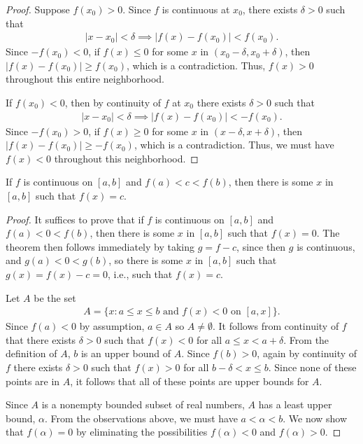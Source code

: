 \documentclass[12pt,letterpaper,reqno]{article}
\numberwithin{equation}{section}
\begin{document}
{\begin{proof}
	Suppose $f(x_0)>0$. Since $f$ is continuous at $x_0$, there exists $\delta>0$ such that 
	\begin{align*}
		|x-x_0|<\delta \implies |f(x)-f(x_0)|<f(x_0).
	\end{align*}
	Since $-f(x_0)<0$, if $f(x)\leq 0$ for some $x$ in $(x_0-\delta,x_0+\delta)$, then $|f(x)-f(x_0)|\geq f(x_0)$, which is a contradiction. Thus, $f(x)>0$ throughout this entire neighborhood.
	
	If $f(x_0)<0$, then by continuity of $f$ at $x_0$ there exists $\delta>0$ such that 
	\begin{align*}
		|x-x_0|<\delta \implies |f(x)-f(x_0)|<-f(x_0).
	\end{align*}
	Since $-f(x_0)>0$, if $f(x) \geq 0$ for some $x$ in $(x-\delta,x+\delta)$, then $|f(x)-f(x_0)|\geq -f(x_0)$, which is a contradiction. Thus, we must have $f(x)<0$ throughout this neighborhood.
\end{proof}

\begin{thm}
	If $f$ is continuous on $[a,b]$ and $f(a)<c<f(b)$, then there is some $x$ in $[a,b]$ such that $f(x)=c$.
\end{thm}

\begin{proof}
	It suffices to prove that if $f$ is continuous on $[a,b]$ and $f(a)<0<f(b)$, then there is some $x$ in $[a,b]$ such that $f(x)=0$. The theorem then follows immediately by taking $g=f-c$, since  then $g$ is continuous, and $g(a)<0<g(b)$, so there is some $x$ in $[a,b]$ such that $g(x)=f(x)-c=0$, i.e., such that $f(x)=c$.
	
	Let $A$ be the set
	\begin{align*}
		A=\{x:a \leq x \leq b \text{ and } f(x)<0 \text{ on } [a,x]\}.
	\end{align*}
	Since $f(a)<0$ by assumption, $a \in A$ so $A \neq \emptyset$. It follows from continuity of $f$ that there exists $\delta>0$ such that $f(x)<0$ for all $a \leq x <a+\delta$. From the definition of $A$, $b$ is an upper bound of $A$. Since $f(b)>0$, again by continuity of $f$ there exists $\delta>0$ such that $f(x)>0$ for all $b-\delta < x \leq b$. Since none of these points are in $A$, it follows that all of these points are upper bounds for $A$.
	
	Since $A$ is a nonempty bounded subset of real numbers, $A$ has a least upper bound, $\alpha$. From the observations above, we must have $a< \alpha<b$. We now show that $f(\alpha)=0$ by eliminating the possibilities $f(\alpha)<0$ and $f(\alpha)>0$.
	

\end{proof}}
\end{document}
